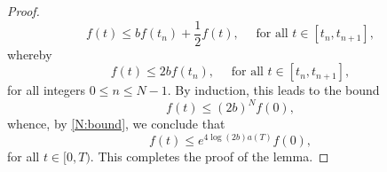 \documentclass[10pt,a4paper]{amsart}
\begin{document}
\begin{proof}
\begin{equation*}
		f(t) \leq b f(t_{n}) + \frac{1}{2} f(t), \quad \text{ for all } t\in [t_{n}, t_{n+1}],
	\end{equation*}
	whereby 
	\begin{equation*}
		f(t) \leq 2b f(t_{n}), \quad \text{ for all } t\in [t_{n}, t_{n+1}],
	\end{equation*}
	for all integers $0\leq n \leq N-1$. By induction, this leads to the bound 
	\begin{equation*}
		f(t) \leq (2b)^{N} f(0) , 
	\end{equation*}
	whence, by \eqref{N:bound}, we conclude that  
	\begin{equation*}
		f(t) \leq  e^{4 \log (2b) a(T)} f(0), 
	\end{equation*}
	 for all $t\in [0,T).$ This completes the proof of the lemma.
\end{proof}
\end{document}
